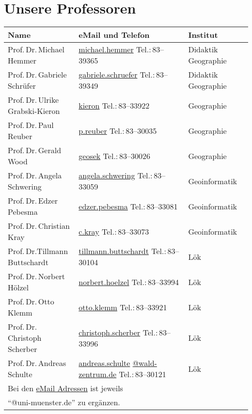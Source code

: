 \newpage

\section{Unsere Professoren}
\begin{small}
\begin{longtable}{p{} p{} p{}}
  Name & eMail und Telefon & Institut\\ \hline \hline
  Prof.\,Dr.\,Michael Hemmer & \url{michael.hemmer} \newline Tel.:\,83--39365 & Didaktik Geographie\\
  Prof.\,Dr.\,Gabriele Schrüfer & \url{gabriele.schruefer} \newline Tel.:\,83--39349 & Didaktik Geographie\\  \hline
  Prof.\,Dr.\,Ulrike Grabski-Kieron & \url{kieron} \newline Tel.:\,83--33922 & Geographie\\
  Prof.\,Dr.\,Paul Reuber & \url{p.reuber} \newline Tel.:\,83--30035 & Geographie\\
  Prof.\,Dr.\,Gerald Wood & \url{geosek} \newline Tel.:\,83--30026 & Geographie\\ \hline
  Prof.\,Dr.\,Angela Schwering & \url{angela.schwering} \newline Tel.:\,83--33059 & Geoinformatik\\
  Prof.\,Dr.\,Edzer Pebesma & \url{edzer.pebesma} \newline Tel.:\,83--33081 & Geoinformatik\\ 
  Prof.\,Dr.\,Christian Kray & \url{c.kray} \newline Tel.:\,83--33073 &  Geoinformatik \\ \hline
  Prof.\,Dr.\newline Tillmann Buttschardt & \url{tillmann.buttschardt} \newline Tel.:\,83--30104 & Lök\\
  Prof.\,Dr.\,Norbert Hölzel & \url{norbert.hoelzel} \newline Tel.:\,83--33994 & Lök\\
  Prof.\,Dr.\,Otto Klemm & \url{otto.klemm} \newline Tel.:\,83--33921 & Lök\\
  Prof.\,Dr.\,Christoph Scherber & \url{christoph.scherber} \newline Tel.:\,83--33996 & Lök\\
  Prof.\,Dr.\,Andreas Schulte & \url{andreas.schulte} \newline \url{@wald-zentrum.de} \newline Tel.:\,83--30121 & Lök\\ 
 \hline
  \multicolumn{3}{l}{Bei den \url{eMail Adressen} ist jeweils} \\
  \multicolumn{3}{l}{``@uni-muenster.de'' zu ergänzen.}\\
\end{longtable}
\end{small}

